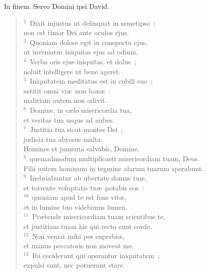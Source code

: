 \bchapter
\lettrine[lines=3,image=true,loversize=0.05,lraise=-0.03]{I}{}n finem. Servo Domini ipsi David.
\begin{flushleft}\begin{verse}\vspace{6pt}${}^{2}$~Dixit injustus ut delinquat in semetipso~:\\ non est timor Dei ante oculos ejus.\\
${}^{3}$~Quoniam dolose egit in conspectu ejus,\\ ut inveniatur iniquitas ejus ad odium.\\
${}^{4}$~Verba oris ejus iniquitas, et dolus~;\\ noluit intelligere ut bene ageret.\\
${}^{5}$~Iniquitatem meditatus est in cubili suo~;\\ astitit omni vi\ae\ non bon\ae~:\\ malitiam autem non odivit.\\
${}^{6}$~Domine, in c\ae lo misericordia tua,\\ et veritas tua usque ad nubes.\\
${}^{7}$~Justitia tua sicut montes Dei~;\\ judicia tua abyssus multa.\\ Homines et jumenta salvabis, Domine,\\
${}^{8}$~quemadmodum multiplicasti misericordiam tuam, Deus.\\ Filii autem hominum in tegmine alarum tuarum sperabunt.\\
${}^{9}$~Inebriabuntur ab ubertate domus tu\ae ,\\ et torrente voluptatis tu\ae\ potabis eos~:\\
${}^{10}$~quoniam apud te est fons vit\ae ,\\ et in lumine tuo videbimus lumen.\\
${}^{11}$~Pr\ae tende misericordiam tuam scientibus te,\\ et justitiam tuam his qui recto sunt corde.\\
${}^{12}$~Non veniat mihi pes superbi\ae ,\\ et manus peccatoris non moveat me.\\
${}^{13}$~Ibi ceciderunt qui operantur iniquitatem~;\\ expulsi sunt, nec potuerunt stare.\end{verse}\end{flushleft}



